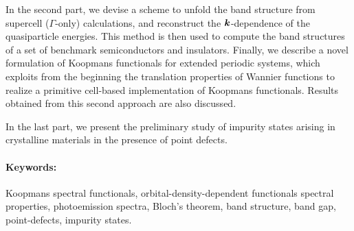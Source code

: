 In the second part, we devise a scheme to unfold the band structure from supercell ($\Gamma$-only) calculations, and reconstruct the ${\bm k}$-dependence of the quasiparticle energies. This method is then used to compute the band structures of a set of benchmark semiconductors and insulators. Finally, we describe a novel formulation of Koopmans functionals for extended periodic systems, which exploits from the beginning the translation properties of Wannier functions to realize a primitive cell-based implementation of Koopmans functionals. Results obtained from this second approach are also discussed.

In the last part, we present the preliminary study of impurity states arising in crystalline materials in the presence of point defects.

%
\paragraph{Keywords:}
Koopmans spectral functionals,
orbital-density-dependent functionals
spectral properties,
photoemission spectra,
Bloch's theorem,
band structure,
band gap,
point-defects,
impurity states.
%

